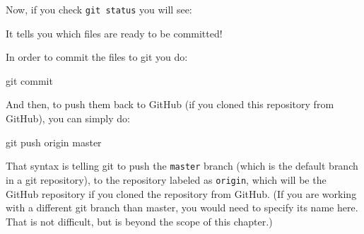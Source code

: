 \documentclass[]{krantz}
\makeatletter
\newenvironment{Shaded}{\begin{snugshade}}{\end{snugshade}}
\newcommand{\ExtensionTok}[1]{#1}
\newcommand{\FunctionTok}[1]{\textcolor[rgb]{0,0,0}{#1}}
\newcommand{\KeywordTok}[1]{\textcolor[rgb]{0.27,0.27,0.27}{\textbf{#1}}}
\newcommand{\NormalTok}[1]{#1}
\newcommand{\StringTok}[1]{\textcolor[rgb]{0.5,0.5,0.5}{#1}}
\newenvironment{kframe}{%
\medskip{}
\setlength{\fboxsep}{.8em}
 \def\at@end@of@kframe{}%
 \ifinner\ifhmode%
  \def\at@end@of@kframe{\end{minipage}}%
  \begin{minipage}{\columnwidth}%
 \fi\fi%
 \def\FrameCommand##1{\hskip\@totalleftmargin \hskip-\fboxsep
 \colorbox{shadecolor}{##1}\hskip-\fboxsep
     \hskip-\linewidth \hskip-\@totalleftmargin \hskip\columnwidth}%
 \MakeFramed {\advance\hsize-\width
   \@totalleftmargin\z@ \linewidth\hsize
   \@setminipage}}%
 {\par\unskip\endMakeFramed%
 \at@end@of@kframe}
\renewenvironment{Shaded}{\begin{kframe}}{\end{kframe}}
\makeatother
\begin{document}
Now, if you check \texttt{git\ status} you will see:

\begin{Shaded}
\end{Shaded}

It tells you which files are ready to be committed!

In order to commit the files to git you do:

\begin{Shaded}
\begin{Highlighting}[]
\FunctionTok{git}\NormalTok{ commit}
\end{Highlighting}
\end{Shaded}

And then, to push them back to GitHub (if you cloned this repository
from GitHub), you can simply do:

\begin{Shaded}
\begin{Highlighting}[]
\FunctionTok{git}\NormalTok{ push origin master}
\end{Highlighting}
\end{Shaded}

That syntax is telling git to push the \texttt{master} branch (which is
the default branch in a git repository), to the repository labeled as
\texttt{origin}, which will be the GitHub repository if you cloned the repository
from GitHub. (If you are working with a different git branch than master,
you would need to specify its name here. That is not difficult, but is
beyond the scope of this chapter.)
\end{document}
